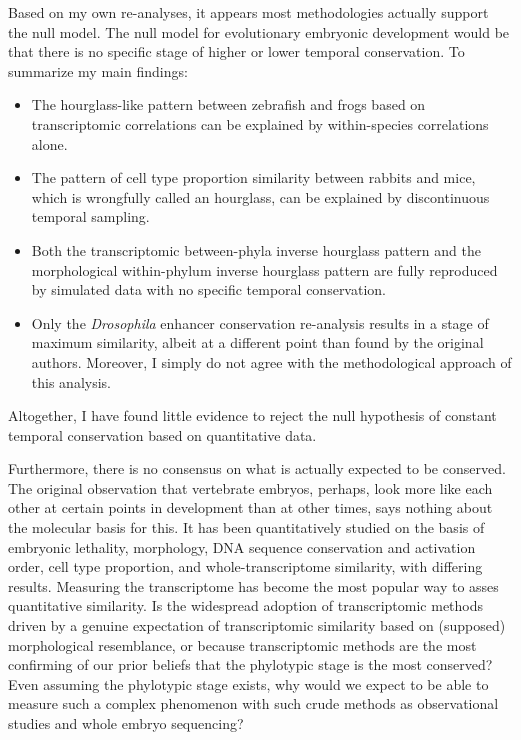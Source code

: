 Based on my own re-analyses, it appears most methodologies actually support the null model. The null model for evolutionary embryonic development would be that there is no specific stage of higher or lower temporal conservation. To summarize my main findings:
\begin{itemize}
    \item The hourglass-like pattern between zebrafish and frogs based on transcriptomic correlations can be explained by within-species correlations alone.
    \item The pattern of cell type proportion similarity between rabbits and mice, which is wrongfully called an hourglass, can be explained by discontinuous temporal sampling.
    \item Both the transcriptomic between-phyla inverse hourglass pattern and the morphological within-phylum inverse hourglass pattern are fully reproduced by simulated data with no specific temporal conservation.
    \item Only the \textit{Drosophila} enhancer conservation re-analysis results in a stage of maximum similarity, albeit at a different point than found by the original authors. Moreover, I simply do not agree with the methodological approach of this analysis.
\end{itemize}
\noindent
Altogether, I have found little evidence to reject the null hypothesis of constant temporal conservation based on quantitative data.

Furthermore, there is no consensus on what is actually expected to be conserved. The original observation that vertebrate embryos, perhaps, look more like each other at certain points in development than at other times, says nothing about the molecular basis for this. It has been quantitatively studied on the basis of embryonic lethality\cite{Uchida2018}, morphology\cite{OlafRP2003,Cordero2020}, DNA sequence conservation\cite{Piasecka2013,Quint2012,Liu2021} and activation order\cite{Uesaka2019}, cell type proportion\cite{Mayshar2023}, and whole-transcriptome similarity\cite{Piasecka2013,Irie2011,marletaz2018,Liu2020,Leong2021,PerezPosada2022,Kalinka2010}, with differing results. Measuring the transcriptome has become the most popular way to asses quantitative similarity. Is the widespread adoption of transcriptomic methods driven by a genuine expectation of transcriptomic similarity based on (supposed) morphological resemblance, or because transcriptomic methods are the most confirming of our prior beliefs that the phylotypic stage is the most conserved? Even assuming the phylotypic stage exists, why would we expect to be able to measure such a complex phenomenon with such crude methods as observational studies and whole embryo sequencing?


